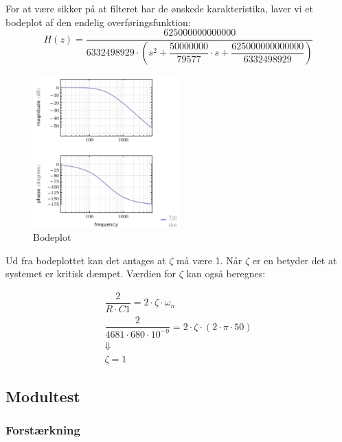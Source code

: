 For at være sikker på at filteret har de ønskede karakteristika, laver vi et bodeplot af den endelig overføringsfunktion: 
\begin{equation}
H(z)=\dfrac{625000000000000}{6332498929\cdot \left( s^2+\dfrac{50000000}{79577}\cdot s + \dfrac{625000000000000}{6332498929} \right)}
\end{equation}
\begin{figure}[H]
	\centering
	\includegraphics[width=0.5\textwidth]{Figurer/Bodeplot}
	\caption{Bodeplot}
	\label{fig:bodeplot}
\end{figure}
Ud fra bodeplottet kan det antages at $ \zeta $ må være 1. Når $ \zeta $ er en betyder det at systemet er kritisk dæmpet. Værdien for $ \zeta $ kan også beregnes: 

\begin{equation}
\begin{split}
\dfrac{2}{R\cdot C1}= 2\cdot \zeta\cdot \omega_n\\
\dfrac{2}{4681\cdot 680\cdot 10^{-9}}= 2\cdot \zeta\cdot (2\cdot \pi \cdot 50)\\
\Downarrow\\
\zeta = 1
\end{split}
\end{equation}

\subsection{Modultest}
\subsubsection{Forstærkning}
